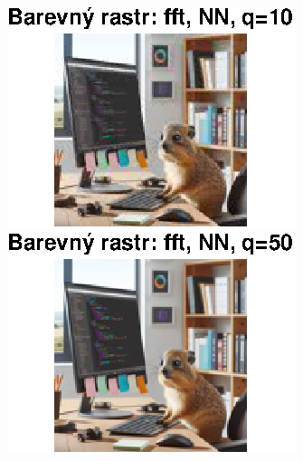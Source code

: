 \begin{figure}[H]
    \centering
    \begin{minipage}[b]{0.3\textwidth}
        \centering
        \includegraphics[width=\textwidth]{images/barevny_fft_NN_q10.eps}
    \end{minipage}
    \hfill
    \begin{minipage}[b]{0.3\textwidth}
        \centering
        \includegraphics[width=\textwidth]{images/barevny_fft_NN_q50.eps}
    \end{minipage}
    \hfill
    \begin{minipage}[b]{0.3\textwidth}
        \centering

\end{minipage}
\end{figure}
